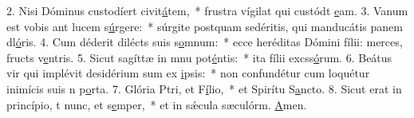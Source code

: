 2. Nisi Dóminus custodíert civit\uline{á}tem,~* frustra vígilat qui custódt \uline{e}am.
3. Vanum est vobis ant lucem s\uline{ú}rgere:~* súrgite postquam sedéritis, qui manducátis panem dl\uline{ó}ris.
4. Cum déderit dilécts suis s\uline{o}mnum:~* ecce heréditas Dómini fílii: merces, fructs v\uline{e}ntris.
5. Sicut sagíttæ in mnu pot\uline{é}ntis:~* ita fílii excss\uline{ó}rum.
6. Beátus vir qui implévit desidérium sum ex \uline{i}psis:~* non confundétur cum loquétur inimícis suis n p\uline{o}rta.
7. Glória Ptri, et F\uline{í}lio,~* et Spirítu S\uline{a}ncto.
8. Sicut erat in princípio, t nunc, et s\uline{e}mper,~* et in sǽcula sæculórm. \uline{A}men.
